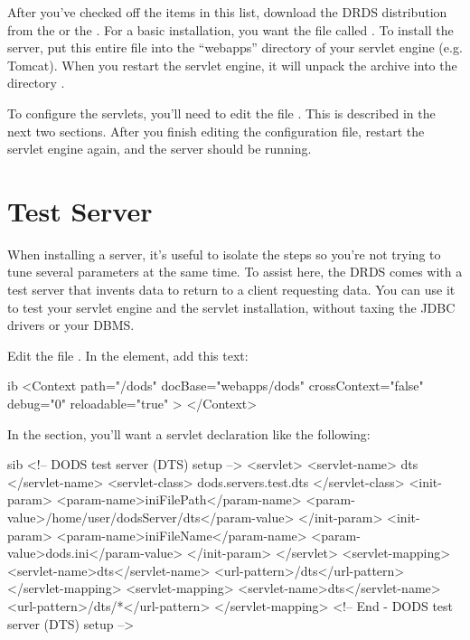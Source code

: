 \documentclass{dods-book}
\begin{document}
After you've checked off the items in this list, download the DRDS
distribution from the \DODShome or the \DODSjava.  For a basic
installation, you want the file called .  To install the
server, put this entire file into the ``webapps'' directory of your
servlet engine (e.g. Tomcat).  When you restart the servlet engine, it
will unpack the archive into the directory .

To configure the servlets, you'll need to edit the file
.   This is described in the next
two sections.  After you finish editing the configuration file,
restart the servlet engine again, and the server should be running.

\section{Test Server}

 When installing a server, it's useful
to isolate the steps so you're not trying to tune several parameters
at the same time. To assist here, the DRDS comes with a test server
that invents data to return to a client requesting data. You can use
it to test your servlet engine and the servlet installation, without
taxing the JDBC drivers or your DBMS. 


Edit the file .  In the
 element, add this text:

\begin{vcode}{ib}
<Context path="/dods"
    docBase="webapps/dods"
    crossContext="false"
    debug="0"
    reloadable="true" >
</Context>
\end{vcode}                                  

In the  section, you'll want a servlet declaration like
the following:

\begin{vcode}{sib}
<!-- DODS test server (DTS) setup -->
<servlet>
    <servlet-name>
        dts
    </servlet-name>
    <servlet-class>
        dods.servers.test.dts
    </servlet-class>
    <init-param>
        <param-name>iniFilePath</param-name>
        <param-value>/home/user/dodsServer/dts</param-value>
    </init-param>
    <init-param>
        <param-name>iniFileName</param-name>
        <param-value>dods.ini</param-value>
    </init-param>
</servlet>
<servlet-mapping>
    <servlet-name>dts</servlet-name>
    <url-pattern>/dts</url-pattern>
</servlet-mapping>
<servlet-mapping>
    <servlet-name>dts</servlet-name>
    <url-pattern>/dts/*</url-pattern>
</servlet-mapping>
<!-- End - DODS test server (DTS) setup -->
\end{vcode}
\end{document}
